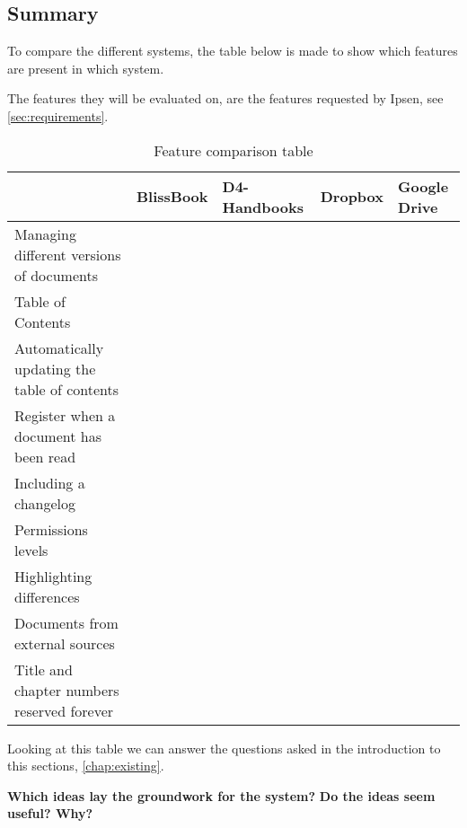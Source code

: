 \subsection{Summary}
To compare the different systems, the table below is made to show which features are present in which system.

The features they will be evaluated on, are the features requested by Ipsen, see \cref{sec:requirements}.

\begin{table}[H]
	\begin{center}
		\begin{tabular}{| m{5cm}|m{1.6cm}|m{2cm}|m{1.5cm}|m{1.2cm}|}
			\hline
			& BlissBook  & D4-Handbooks & Dropbox & Google \newline Drive \\
			\hline
			Managing different versions of documents & \checkmark &  &  & \checkmark \\
			\hline
			Table of Contents & \checkmark & \checkmark  & & \\
			\hline
			Automatically updating the table of contents & \checkmark & \checkmark  &  & \\
			\hline
			Register when a document has been read & \checkmark & \checkmark &  & \\
			\hline
			Including a changelog & \checkmark & \checkmark  &  & \\
			\hline
			Permissions levels & \checkmark &  & \checkmark & \checkmark \\
			\hline
			Highlighting differences & \checkmark &  &  & \checkmark\\
			\hline
			Documents from external \newline sources &  &  & \checkmark & \checkmark \\
			\hline
			Title and chapter numbers \newline reserved forever &  &  &  & \\
			\hline
		\end{tabular}
		\caption{Feature comparison table}\label{tab:Exsisting}
	\end{center}
\end{table}

Looking at this table we can answer the questions asked in the introduction to this sections, \cref{chap:existing}.

\textbf{Which ideas lay the groundwork for the system?}
\newline\indent
\textbf{Do the ideas seem useful? Why?}

